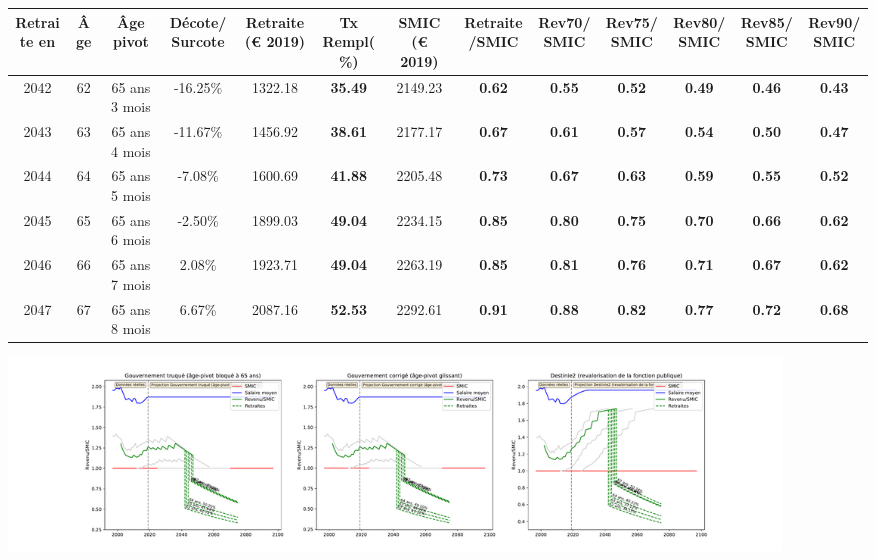 { \scriptsize \begin{center} 
\begin{tabular}[htb]{|c|c||c|c||c|c||c||c|c|c|c|c|c|} 
\hline 
 Retraite en &  Âge &  Âge pivot &  Décote/Surcote &  Retraite (\euro{} 2019) &  Tx Rempl(\%) &  SMIC (\euro{} 2019) &  Retraite/SMIC &  Rev70/SMIC &  Rev75/SMIC &  Rev80/SMIC &  Rev85/SMIC &  Rev90/SMIC \\ 
\hline \hline 
 2042 &  62 &  65 ans 3 mois &  -16.25\% &  1322.18 &  {\bf 35.49} &  2149.23 &  {\bf {\color{red} 0.62}} &  {\bf {\color{red} 0.55}} &  {\bf {\color{red} 0.52}} &  {\bf {\color{red} 0.49}} &  {\bf {\color{red} 0.46}} &  {\bf {\color{red} 0.43}} \\ 
\hline 
 2043 &  63 &  65 ans 4 mois &  -11.67\% &  1456.92 &  {\bf 38.61} &  2177.17 &  {\bf {\color{red} 0.67}} &  {\bf {\color{red} 0.61}} &  {\bf {\color{red} 0.57}} &  {\bf {\color{red} 0.54}} &  {\bf {\color{red} 0.50}} &  {\bf {\color{red} 0.47}} \\ 
\hline 
 2044 &  64 &  65 ans 5 mois &  -7.08\% &  1600.69 &  {\bf 41.88} &  2205.48 &  {\bf {\color{red} 0.73}} &  {\bf {\color{red} 0.67}} &  {\bf {\color{red} 0.63}} &  {\bf {\color{red} 0.59}} &  {\bf {\color{red} 0.55}} &  {\bf {\color{red} 0.52}} \\ 
\hline 
 2045 &  65 &  65 ans 6 mois &  -2.50\% &  1899.03 &  {\bf 49.04} &  2234.15 &  {\bf {\color{red} 0.85}} &  {\bf {\color{red} 0.80}} &  {\bf {\color{red} 0.75}} &  {\bf {\color{red} 0.70}} &  {\bf {\color{red} 0.66}} &  {\bf {\color{red} 0.62}} \\ 
\hline 
 2046 &  66 &  65 ans 7 mois &  2.08\% &  1923.71 &  {\bf 49.04} &  2263.19 &  {\bf {\color{red} 0.85}} &  {\bf {\color{red} 0.81}} &  {\bf {\color{red} 0.76}} &  {\bf {\color{red} 0.71}} &  {\bf {\color{red} 0.67}} &  {\bf {\color{red} 0.62}} \\ 
\hline 
 2047 &  67 &  65 ans 8 mois &  6.67\% &  2087.16 &  {\bf 52.53} &  2292.61 &  {\bf {\color{red} 0.91}} &  {\bf {\color{red} 0.88}} &  {\bf {\color{red} 0.82}} &  {\bf {\color{red} 0.77}} &  {\bf {\color{red} 0.72}} &  {\bf {\color{red} 0.68}} \\ 
\hline 
\hline 
\end{tabular} 
\end{center} } 

 \begin{center}\includegraphics[width=0.9\textwidth]{fig/BIATSS_1980_22_dest_retraite.pdf}\end{center} \label{fig/BIATSS_1980_22_dest_retraite.pdf} 

